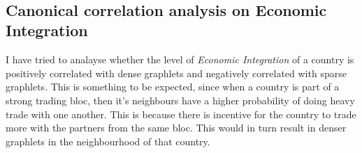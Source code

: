 \documentclass[11pt,a4paper,oneside]{report}
\begin{document}
\begin{figure}[H]
  \\

\end{figure}



\appendix



\subsection*{Canonical correlation analysis on Economic Integration}

I have tried to analayse whether the level of \emph{Economic Integration} of a country is positively correlated with dense graphlets and negatively correlated with sparse graphlets. This is something to be expected, since when a country is part of a strong trading bloc, then it's neighbours have a higher probability of doing heavy trade with one another. This is because there is incentive for the country to trade more with the partners from the same bloc. This would in turn result in denser graphlets in the neighbourhood of that country. 
\end{document}
